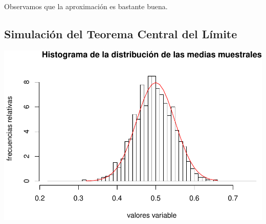 \documentclass[]{book}
\begin{document}
Observamos que la aproximación es bastante buena.

\hypertarget{simulaciuxf3n-del-teorema-central-del-luxedmite-2}{%
\subsection{Simulación del Teorema Central del Límite}\label{simulaciuxf3n-del-teorema-central-del-luxedmite-2}}

\includegraphics{curso-probabilidad-udemy_files/figure-latex/unnamed-chunk-186-1.pdf}


\end{document}
